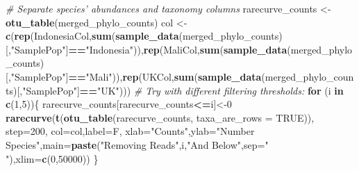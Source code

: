 \documentclass[]{article}
\newenvironment{Shaded}{\begin{snugshade}}{\end{snugshade}}
\newcommand{\CommentTok}[1]{\textcolor[rgb]{0.56,0.35,0.01}{\textit{#1}}}
\newcommand{\ControlFlowTok}[1]{\textcolor[rgb]{0.13,0.29,0.53}{\textbf{#1}}}
\newcommand{\DataTypeTok}[1]{\textcolor[rgb]{0.13,0.29,0.53}{#1}}
\newcommand{\DecValTok}[1]{\textcolor[rgb]{0.00,0.00,0.81}{#1}}
\newcommand{\KeywordTok}[1]{\textcolor[rgb]{0.13,0.29,0.53}{\textbf{#1}}}
\newcommand{\NormalTok}[1]{#1}
\newcommand{\OperatorTok}[1]{\textcolor[rgb]{0.81,0.36,0.00}{\textbf{#1}}}
\newcommand{\OtherTok}[1]{\textcolor[rgb]{0.56,0.35,0.01}{#1}}
\newcommand{\StringTok}[1]{\textcolor[rgb]{0.31,0.60,0.02}{#1}}
\begin{document}
\begin{Shaded}
\begin{Highlighting}[]
\CommentTok{# Separate species' abundances and taxonomy columns}
\NormalTok{rarecurve_counts <-}\StringTok{ }\KeywordTok{otu_table}\NormalTok{(merged_phylo_counts)}
\NormalTok{col <-}\StringTok{ }\KeywordTok{c}\NormalTok{(}\KeywordTok{rep}\NormalTok{(IndonesiaCol,}\KeywordTok{sum}\NormalTok{(}\KeywordTok{sample_data}\NormalTok{(merged_phylo_counts)[,}\StringTok{"SamplePop"}\NormalTok{]}\OperatorTok{==}\StringTok{"Indonesia"}\NormalTok{)),}\KeywordTok{rep}\NormalTok{(MaliCol,}\KeywordTok{sum}\NormalTok{(}\KeywordTok{sample_data}\NormalTok{(merged_phylo_counts)[,}\StringTok{"SamplePop"}\NormalTok{]}\OperatorTok{==}\StringTok{"Mali"}\NormalTok{)),}\KeywordTok{rep}\NormalTok{(UKCol,}\KeywordTok{sum}\NormalTok{(}\KeywordTok{sample_data}\NormalTok{(merged_phylo_counts)[,}\StringTok{"SamplePop"}\NormalTok{]}\OperatorTok{==}\StringTok{"UK"}\NormalTok{)))}
\CommentTok{# Try with different filtering thresholds:}
\ControlFlowTok{for}\NormalTok{ (i }\ControlFlowTok{in} \KeywordTok{c}\NormalTok{(}\DecValTok{1}\NormalTok{,}\DecValTok{5}\NormalTok{))\{}
\NormalTok{    rarecurve_counts[rarecurve_counts}\OperatorTok{<=}\NormalTok{i]<-}\DecValTok{0}
    \KeywordTok{rarecurve}\NormalTok{(}\KeywordTok{t}\NormalTok{(}\KeywordTok{otu_table}\NormalTok{(rarecurve_counts, }\DataTypeTok{taxa_are_rows =} \OtherTok{TRUE}\NormalTok{)), }\DataTypeTok{step=}\DecValTok{200}\NormalTok{, }\DataTypeTok{col=}\NormalTok{col,}\DataTypeTok{label=}\NormalTok{F, }\DataTypeTok{xlab=}\StringTok{"Counts"}\NormalTok{,}\DataTypeTok{ylab=}\StringTok{"Number Species"}\NormalTok{,}\DataTypeTok{main=}\KeywordTok{paste}\NormalTok{(}\StringTok{"Removing Reads"}\NormalTok{,i,}\StringTok{"And Below"}\NormalTok{,}\DataTypeTok{sep=}\StringTok{" "}\NormalTok{),}\DataTypeTok{xlim=}\KeywordTok{c}\NormalTok{(}\DecValTok{0}\NormalTok{,}\DecValTok{50000}\NormalTok{))}
\NormalTok{\}}


\end{Highlighting}
\end{Shaded}
\end{document}
